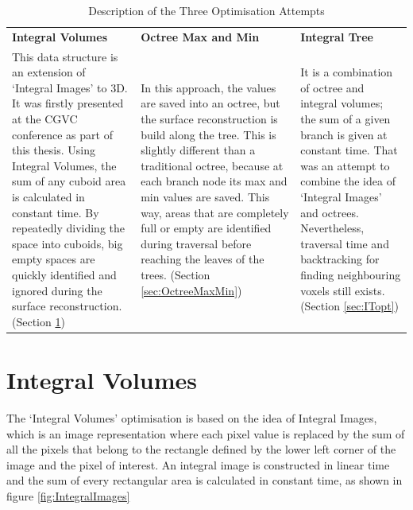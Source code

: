 \documentclass{subfiles}
\begin{document}
\begin{table}[!htbp]
	\renewcommand{\arraystretch}{1.3}
	
	\centering
	\begin{tabular}{|P{0.3\textwidth}|P{0.3\textwidth}|P{0.3\textwidth}|}	
		\hline
		\textbf{Integral Volumes} &	\textbf{Octree Max and Min} & \textbf{Integral Tree}  \\
		\hlinewd{1.5pt}
		{\color{blue} This data structure is an extension of `Integral Images' to 3D. It was firstly presented at the CGVC conference as part of this thesis. Using Integral Volumes, the sum of any cuboid area is calculated in constant time. By repeatedly dividing the space into cuboids, big empty spaces are quickly identified and ignored during the surface reconstruction. \newline(Section \ref{sec:IVopt}) }&	{\color{blue}In this approach, the values are saved into an octree, but the surface reconstruction is build along the tree. This is slightly different than a traditional octree, because at each branch node its max and min values are saved. This way, areas that are completely full or empty are identified during traversal before reaching the leaves of the trees. (Section \ref{sec:OctreeMaxMin}) } &{\color{blue} It is a combination of octree and integral volumes; the sum of a given branch is given at constant time. That was an attempt to combine the idea of `Integral Images' and octrees. Nevertheless, traversal time and backtracking for finding neighbouring voxels still exists. (Section \ref{sec:ITopt})}\\	
		\hline
	\end{tabular}
	\caption{Description of the Three Optimisation Attempts}
	\label{tab:DataStructuresOptimised}
\end{table}

\newpage

\section{Integral Volumes}\label{sec:IVopt}
The `Integral Volumes' optimisation is based on the idea of Integral Images, which is an image representation where each pixel value is replaced by the sum of all the pixels that belong to the rectangle defined by the lower left corner of the image and the pixel of interest.  An integral image is constructed in linear time and the sum of every rectangular area is calculated in constant time, as shown in figure \ref{fig:IntegralImages} \cite{Crow1984}
\end{document}
